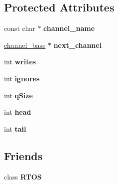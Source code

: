 \subsection*{Protected Attributes}
\begin{DoxyCompactItemize}
\item 
const char $\ast$ {\bfseries channel\+\_\+name}\hypertarget{class_r_t_o_s_1_1channel__base_a2bb25fb293fd233b6dc3ff32499b28c4}{}\label{class_r_t_o_s_1_1channel__base_a2bb25fb293fd233b6dc3ff32499b28c4}

\item 
\hyperlink{class_r_t_o_s_1_1channel__base}{channel\+\_\+base} $\ast$ {\bfseries next\+\_\+channel}\hypertarget{class_r_t_o_s_1_1channel__base_a51b4bf40bab66baad02b1093fb508f9c}{}\label{class_r_t_o_s_1_1channel__base_a51b4bf40bab66baad02b1093fb508f9c}

\item 
int {\bfseries writes}\hypertarget{class_r_t_o_s_1_1channel__base_aad82d7f5a2585f45ddca2268f4d35876}{}\label{class_r_t_o_s_1_1channel__base_aad82d7f5a2585f45ddca2268f4d35876}

\item 
int {\bfseries ignores}\hypertarget{class_r_t_o_s_1_1channel__base_a573da302e6106eb461d7d50474b1975a}{}\label{class_r_t_o_s_1_1channel__base_a573da302e6106eb461d7d50474b1975a}

\item 
int {\bfseries q\+Size}\hypertarget{class_r_t_o_s_1_1channel__base_a2edc0d4eed9af8e0fccf1288dcb3dafb}{}\label{class_r_t_o_s_1_1channel__base_a2edc0d4eed9af8e0fccf1288dcb3dafb}

\item 
int {\bfseries head}\hypertarget{class_r_t_o_s_1_1channel__base_a46db06f8fcca0241ed2391589db69bae}{}\label{class_r_t_o_s_1_1channel__base_a46db06f8fcca0241ed2391589db69bae}

\item 
int {\bfseries tail}\hypertarget{class_r_t_o_s_1_1channel__base_ae6aeb780debe979366de36c1da9aabe4}{}\label{class_r_t_o_s_1_1channel__base_ae6aeb780debe979366de36c1da9aabe4}

\end{DoxyCompactItemize}
\subsection*{Friends}
\begin{DoxyCompactItemize}
\item 
class {\bfseries R\+T\+OS}\hypertarget{class_r_t_o_s_1_1channel__base_aa5b30b5b619f01a5d94b779bf0e58610}{}\label{class_r_t_o_s_1_1channel__base_aa5b30b5b619f01a5d94b779bf0e58610}

\end{DoxyCompactItemize}


